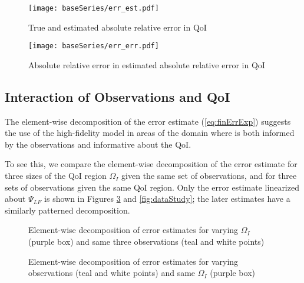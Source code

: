 \begin{figure}[h]
\centering
\texttt{[image: baseSeries/err\_est.pdf]}
\caption{True and estimated absolute relative error in QoI}
\label{fig:baseErr}
\end{figure}

\begin{figure}[h]
\centering
\texttt{[image: baseSeries/err\_err.pdf]}
\caption{Absolute relative error in estimated absolute relative error in QoI }
\label{fig:baseErrErr}
\end{figure}

\subsection{Interaction of Observations and QoI}

The element-wise decomposition of the error estimate (\ref{eq:finErrExp}) suggests the use of the high-fidelity model in areas of the domain where  is both informed by the observations and informative about the QoI. %

To see this, we compare the element-wise decomposition of the error estimate for three sizes of the QoI region $\Omega_I$ given the same set of observations, and for three sets of observations given the same QoI region. Only the error estimate linearized about $\Psi_{LF}$ is shown in Figures \ref{fig:qoiStudy} and \ref{fig:dataStudy}; the later estimates have a similarly patterned decomposition.

\begin{figure}
\centering
{}
\caption{Element-wise decomposition of error estimates for varying $\Omega_I$ (purple box) and same three observations (teal and white points)}
\label{fig:qoiStudy}
\end{figure}

\begin{figure}
\centering
{}
\caption{Element-wise decomposition of error estimates for varying observations (teal and white points) and same $\Omega_I$ (purple box)}
\label{fig:datStudy}
\end{figure}

